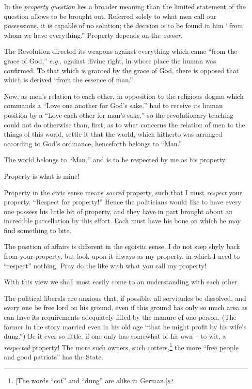 In the \textit{property question} lies a broader meaning than the limited 
statement of the question allows to be brought out. Referred solely to what 
men call our possessions, it is capable of no solution; the decision is to be 
found in him ``from whom we have everything.'' Property depends on the 
\textit{owner}.

The Revolution directed its weapons against everything which came ``from the 
grace of God,'' \textit{e.g.}, against divine right, in whose place the 
human was confirmed. To that which is granted by the grace of God, there is 
opposed that which is derived ``from the essence of man.''

Now, as men's relation to each other, in opposition to the religious dogma 
which commands a ``Love one another for God's sake,'' had to receive its 
human position by a ``Love each other for man's sake,'' so the revolutionary 
teaching could not do otherwise than, first, as to what concerns the relation 
of men to the things of this world, settle it that the world, which hitherto 
was arranged according to God's ordinance, henceforth belongs to ``Man.''

The world belongs to ``Man,'' and is to be respected by me as his property.

Property is what is mine!

Property in the civic sense means \textit{sacred} property, such that I must 
\textit{respect} your property. ``Respect for property!'' Hence the 
politicians would like to have every one possess his little bit of property, 
and they have in part brought about an incredible parcellation by this effort. 
Each must have his bone on which he may find something to bite.

The position of affairs is different in the egoistic sense. I do not step 
shyly back from your property, but look upon it always as my property, in 
which I need to ``respect'' nothing. Pray do the like with what you call my 
property!

With this view we shall most easily come to an understanding with each other.

The political liberals are anxious that, if possible, all servitudes be 
dissolved, and every one be free lord on his ground, even if this ground has 
only so much area as can have its requirements adequately filled by the manure 
of one person. (The farmer in the story married even in his old age ``that he 
might profit by his wife's dung.'') Be it ever so little, if one only has 
somewhat of his own -- to wit, a \textit{respected} property! The more such 
owners, such cotters,\footnote{[The words ``cot'' and ``dung'' are alike 
in German.]} the more ``free people and good patriots'' has the State.

